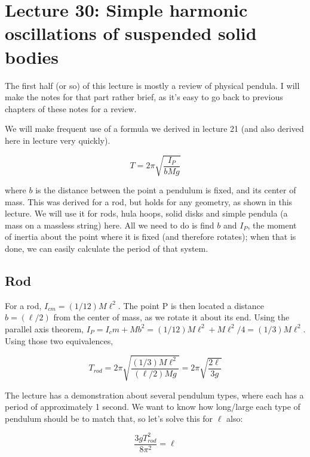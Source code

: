 
\section{Lecture 30: Simple harmonic oscillations of suspended solid bodies}

The first half (or so) of this lecture is mostly a review of physical pendula. I will make the notes for that part rather brief, as it's easy to go back to previous chapters of these notes for a review.

We will make frequent use of a formula we derived in lecture 21 (and also derived here in lecture very quickly).

\begin{equation}
T = 2 \pi \sqrt{\frac{I_P}{b M g}}
\end{equation}

where $b$ is the distance between the point a pendulum is fixed, and its center of mass. This was derived for a rod, but holds for any geometry, as shown in this lecture. We will use it for rods, hula hoops, solid disks and simple pendula (a mass on a massless string) here. All we need to do is find $b$ and  $I_P$, the moment of inertia about the point where it is fixed (and therefore rotates); when that is done, we can easily calculate the period of that system.

\subsection{Rod}

For a rod, $I_{cm} = (1/12) M \ell^2$. The point P is then located a distance $b = (\ell/2)$ from the center of mass, as we rotate it about its end. Using the parallel axis theorem, $I_P = I_cm + M b^2 = (1/12) M \ell^2 + M \ell^2/4 = (1/3) M \ell^2$. Using those two equivalences,

\begin{equation}
T_{rod} = 2 \pi \sqrt{\frac{(1/3) M \ell^2}{(\ell/2) M g}} =  2 \pi \sqrt{\frac{2 \ell}{3g}}
\end{equation}

The lecture has a demonstration about several pendulum types, where each has a period of approximately 1 second. We want to know how long/large each type of pendulum should be to match that, so let's solve this for $\ell$ also:

\begin{equation}
\frac{3 g T_{rod}^2}{8\pi^2} = \ell
\end{equation}

